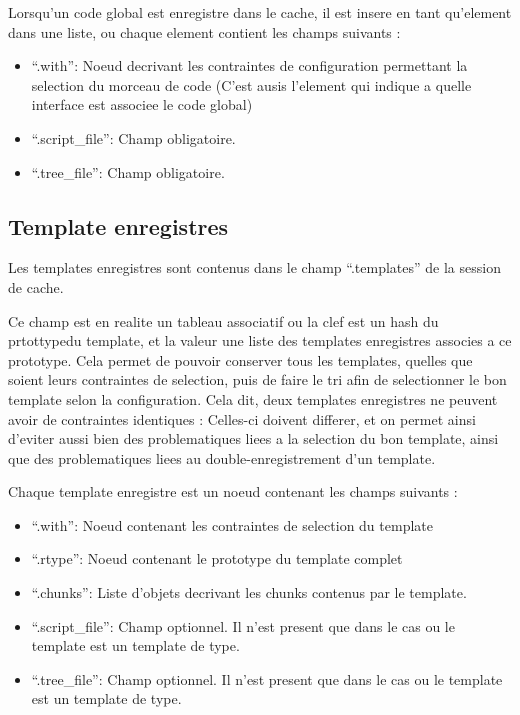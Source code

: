 \documentclass[french]{rtxreport}
\begin{document}
\begin{enumerate}
Lorsqu'un code global est enregistre dans le cache, il est insere en tant
qu'element dans une liste, ou chaque element contient les champs suivants :
\begin{itemize}
    \item ``.with'': Noeud decrivant les contraintes de configuration
        permettant la selection du morceau de code (C'est ausis l'element qui
        indique a quelle interface est associee le code global)
    \item ``.script\_file'': Champ obligatoire.
    \item ``.tree\_file'': Champ obligatoire.
\end{itemize}


\subsection{Template enregistres}

Les templates enregistres sont contenus dans le champ ``.templates'' de la
session de cache.

Ce champ est en realite un tableau associatif ou la clef est un hash du
prtottypedu template, et la valeur une liste des templates enregistres associes
a ce prototype. Cela permet de pouvoir conserver tous les templates, quelles
que soient leurs contraintes de selection, puis de faire le tri afin de
selectionner le bon template selon la configuration. Cela dit, deux templates
enregistres ne peuvent avoir de contraintes identiques : Celles-ci doivent
differer, et on permet ainsi d'eviter aussi bien des problematiques liees a la
selection du bon template, ainsi que des problematiques liees au
double-enregistrement d'un template.

Chaque template enregistre est un noeud contenant les champs suivants :
\begin{itemize}
    \item ``.with'': Noeud contenant les contraintes de selection du template
    \item ``.rtype'': Noeud contenant le prototype du template complet
    \item ``.chunks'': Liste d'objets decrivant les chunks contenus par le
        template.
    \item ``.script\_file'': Champ optionnel. Il n'est present que dans le cas
        ou le template est un template de type.
    \item ``.tree\_file'': Champ optionnel. Il n'est present que dans le cas
        ou le template est un template de type.
\end{itemize}


\end{enumerate}
\end{document}
